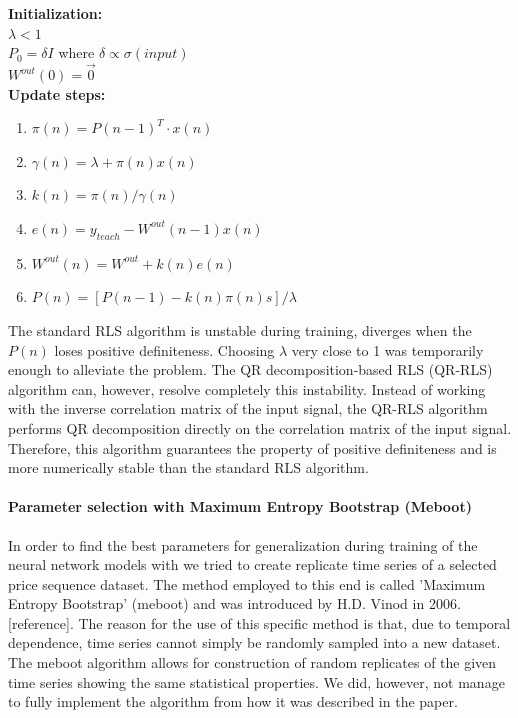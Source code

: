 \begin{itemize}
\begin{algorithm}[H]
\textbf{Initialization:}\\
$\lambda < 1$\\
$P_0 = \delta I$ where $\delta \propto \sigma(input)$\\
$W^{out}(0) = \vec{0}$\\
\textbf{Update steps:}\\
\begin{enumerate}
\item $\pi(n) = P(n-1)^T \cdot x(n)$
\item $\gamma(n) = \lambda + \pi(n)x(n)$
\item $k(n) = \pi(n)/\gamma(n)$
\item $e(n) = y_{teach}-W^{out}(n-1)x(n)$
\item $W^{out}(n)=W^{out}+k(n)e(n)$
\item $P(n) = [P(n-1)-k(n)\pi(n)s]/\lambda$
\end{enumerate}
\end{algorithm}
The standard RLS algorithm is unstable during training, diverges when the $P(n)$ loses positive definiteness. Choosing $\lambda$ very close to 1 was temporarily enough to alleviate the problem. The QR decomposition-based RLS (QR-RLS) algorithm can, however, resolve completely this instability. Instead of working with the inverse correlation matrix of the input signal, the QR-RLS algorithm performs QR decomposition directly on the correlation matrix of the input signal. Therefore, this algorithm guarantees the property of positive definiteness and is more numerically stable than the standard RLS algorithm.
\end{itemize}


\paragraph*{Parameter selection with Maximum Entropy Bootstrap (Meboot)}
In order to find the best parameters for generalization during training of the neural network models with we tried to create replicate time series of a selected price sequence dataset. The method employed to this end is called 'Maximum Entropy Bootstrap' (meboot) and was introduced by H.D. Vinod in 2006. [reference]. The reason for the use of this specific method is that, due to temporal dependence, time series cannot simply be randomly sampled into a new dataset. The meboot algorithm allows for construction of random replicates of the given time series showing the same statistical properties. We did, however, not manage to fully implement the algorithm from how it was described in the paper.

